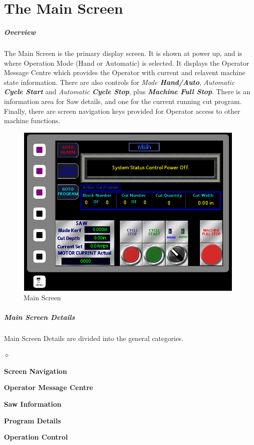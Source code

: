 \chapter{The Main Screen}
\paragraph{Overview}
The Main Screen is the primary display screen. It is shown at power up, and is where Operation Mode (Hand or Automatic) is selected. It displays the Operator Message Centre which provides the Operator with current and relavent machine state information. There are also controls for \textit{Mode \textbf{Hand/Auto}}, \textit{Automatic \textbf{Cycle Start}} and \textit{Automatic \textbf{Cycle Stop}}, plus \textbf{\textit{Machine Full Stop}}. There is an information area for Saw details, and one for the current running cut program. Finally, there are screen navigation keys provided for Operator access to other machine functions.
\begin{figure}
	\centering
	\includegraphics[width=0.5\linewidth]{screen-captures/main-screen}
	\caption{Main Screen}
	\label{fig:main-screen}
\end{figure}
\pagebreak
\paragraph{Main Screen Details}
Main Screen Details are divided into the general categories.
\begin{list}{$\diamond$}{}
	\item \textbf{Screen Navigation}
	\item \textbf{Operator Message Centre}
	\item \textbf{Saw Information}
	\item \textbf{Program Details}
	\item \textbf{Operation Control}
\end{list}
